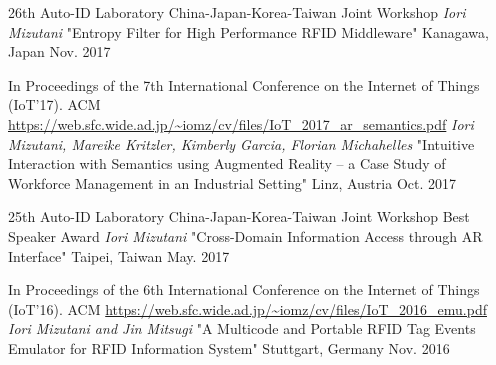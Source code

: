 

\begin{cventries}

  \cventry
    {26th Auto-ID Laboratory China-Japan-Korea-Taiwan Joint Workshop} %
    {{\fontsize{8pt}{1em}\bodyfont\slshape\color{graytext} Iori Mizutani} "Entropy Filter for High Performance RFID Middleware"} %
    {Kanagawa, Japan} %
    {Nov. 2017} %
    {
      \begin{cvitems}
      \end{cvitems}
    }

  \cventry
    {In Proceedings of the 7th International Conference on the Internet of Things (IoT’17). ACM \url{https://web.sfc.wide.ad.jp/~iomz/cv/files/IoT_2017_ar_semantics.pdf}} %
    {{\fontsize{8pt}{1em}\bodyfont\slshape\color{graytext} Iori Mizutani, Mareike Kritzler, Kimberly Garcia, Florian Michahelles} "Intuitive Interaction with Semantics using Augmented Reality – a Case Study of Workforce Management in an Industrial Setting"} %
    {Linz, Austria} %
    {Oct. 2017} %
    {
      \begin{cvitems}
      \end{cvitems}
    }

  \cventry
    {25th Auto-ID Laboratory China-Japan-Korea-Taiwan Joint Workshop \*Best Speaker Award} %
    {{\fontsize{8pt}{1em}\bodyfont\slshape\color{graytext} Iori Mizutani} "Cross-Domain Information Access through AR Interface"} %
    {Taipei, Taiwan} %
    {May. 2017} %
    {
      \begin{cvitems}
      \end{cvitems}
    }

  \cventry
    {In Proceedings of the 6th International Conference on the Internet of Things (IoT’16). ACM \url{https://web.sfc.wide.ad.jp/~iomz/cv/files/IoT_2016_emu.pdf}} %
    {{\fontsize{8pt}{1em}\bodyfont\slshape\color{graytext} Iori Mizutani and Jin Mitsugi} "A Multicode and Portable RFID Tag Events Emulator for RFID Information System"} %
    {Stuttgart, Germany} %
    {Nov. 2016} %
    {
      \begin{cvitems}
      \end{cvitems}
    }


\end{cventries}
